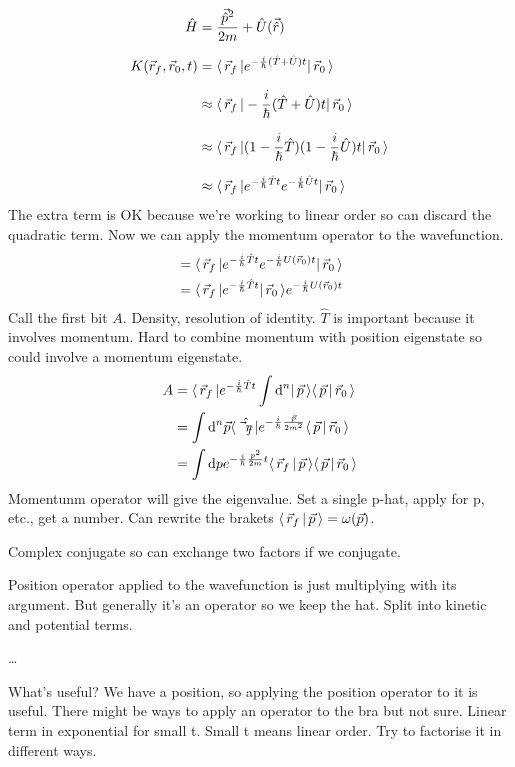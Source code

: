 \documentclass[a4paper]{extarticle}
\newcommand{\ihbar}{\frac{i}{\hbar}}
\newcommand{\propagator}{K(\vec{r}_f, \vec{r}_0, t)}
\begin{document}
\begin{align}
  \hat{H}
   & = \frac{\vec{\hat{p}}^2}{2m} + \hat{U}(\vec{\hat{r}})                            \\[1.5ex]
  \propagator
   & = \bra{\vec{r}_f} e^{-\ihbar (\hat{T} + \hat{U}) t} \ket{\vec{r}_0}              \\[1.5ex]
   & \approx \bra{\vec{r}_f} -\ihbar (\hat{T} + \hat{U}) t \ket{\vec{r}_0}            \\[1.5ex]
   & \approx \bra{\vec{r}_f} (1 - \ihbar\hat{T})(1 - \ihbar\hat{U}) t \ket{\vec{r}_0} \\[1.5ex]
   & \approx \bra{\vec{r}_f} e^{-\ihbar\hat{T}t} e^{-\ihbar\hat{U}t} \ket{\vec{r}_0}
\end{align}
The extra term is OK because we're working to linear order so can discard the
quadratic term.
Now we can apply the momentum operator to the wavefunction.
\begin{align}
   & = \bra{\vec{r}_f} e^{-\ihbar\hat{T}t} e^{-\ihbar U(\vec{r}_0) t} \ket{\vec{r}_0} \\
   & = \bra{\vec{r}_f} e^{-\ihbar\hat{T}t} \ket{\vec{r}_0} e^{-\ihbar U(\vec{r}_0) t}
\end{align}
Call the first bit $A$.
Density, resolution of identity.
$\hat{T}$ is important because it involves momentum.
Hard to combine momentum with position eigenstate so could involve a momentum eigenstate.
\begin{align}
  A
   & = \bra{\vec{r}_f} e^{-\ihbar\hat{T}t} \int \text{d}^n \ket{\vec{p}} \braket{\vec{p}}{\vec{r}_0}                  \\
   & = \int \text{d}^n\vec{p} \bra{\hat{\vec{r}_f}} e^{-\ihbar\frac{\hat{\vec{p}}}{2m^2}} \braket{\vec{p}}{\vec{r}_0} \\
   & = \int \text{d}p e^{-\ihbar\frac{p^2}{2m}t} \braket{\vec{r}_f}{\vec{p}} \braket{\vec{p}}{\vec{r}_0}
\end{align}
Momentunm operator will give the eigenvalue.
Set a single p-hat, apply for p, etc., get a number.
Can rewrite the brakets $\langle\,\vec{r}_f\,\vert\,\vec{p}\,\rangle = \omega(\vec{p})$.

Complex conjugate so can exchange two factors if we conjugate.


Position operator applied to the wavefunction is just multiplying with its argument.
But generally it's an operator so we keep the hat.
Split into kinetic and potential terms.

\dots

What's useful? We have a position, so applying the position operator to it is useful.
There might be ways to apply an operator to the bra but not sure.
Linear term in exponential for small t.
Small t means linear order.
Try to factorise it in different ways.
\end{document}
